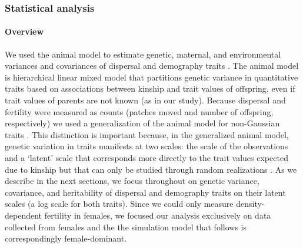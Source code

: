 \documentclass[11pt]{article}
\begin{document}
\subsubsection*{Statistical analysis}
\paragraph{Overview}
We used the animal model to estimate genetic, maternal, and environmental variances and covariances of dispersal and demography traits \citep{lynch_genetics_1998,kruuk_estimating_2004,wilson_ecologists_2010}.
The animal model is hierarchical linear mixed model that partitions genetic variance in quantitative traits based on associations between kinship and trait values of offspring, even if trait values of parents are not known (as in our study).
Because dispersal and fertility were measured as counts (patches moved and number of offspring, respectively) we used a generalization of the animal model for non-Gaussian traits \citep{de2016general}.
This distinction is important because, in the generalized animal model, genetic variation in traits manifests at two scales: the scale of the observations and a `latent' scale that corresponds more directly to the trait values expected due to kinship but that can only be studied through random realizations \citep{de2016general}.
As we describe in the next sections, we focus throughout on genetic variance, covariance, and heritability of dispersal and demography traits on their latent scales (a log scale for both traits).
Since we could only measure density-dependent fertility in females, we focused our analysis exclusively on data collected from females and the the simulation model that follows is correspondingly female-dominant.
\end{document}
